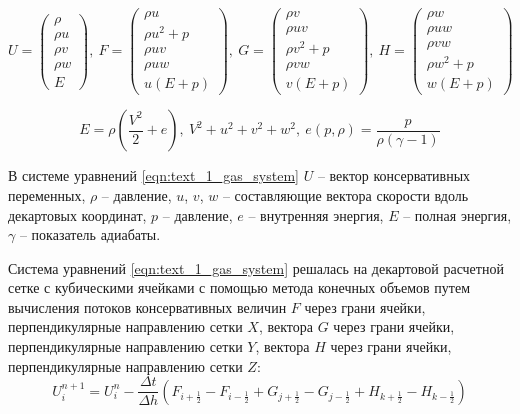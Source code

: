 \begin{equation}
U = \begin{pmatrix}
	\rho \\
	\rho u \\
	\rho v \\
	\rho w \\
	E
\end{pmatrix}, \
F = \begin{pmatrix}
	\rho u \\
	\rho u^2 + p \\
	\rho u v \\
	\rho u w \\
	u (E + p)
\end{pmatrix}, \
G = \begin{pmatrix}
	\rho v \\
	\rho u v \\
	\rho v^2 + p \\
	\rho v w \\
	v (E + p)
\end{pmatrix}, \
H = \begin{pmatrix}
	\rho w \\
	\rho u w \\
	\rho v w \\
	\rho w^2 + p \\
	w (E + p)
\end{pmatrix}
\end{equation}

\begin{equation}
	E = \rho \left( \frac{V^2}{2} + e \right), \ V^2 + u^2 + v^2 + w^2, \ e(p, \rho) = \frac{p}{\rho (\gamma - 1)}
\end{equation}

В системе уравнений \eqref{eqn:text_1_gas_system} $U$ -- вектор консервативных переменных, $\rho$ -- давление, $u$, $v$, $w$ -- составляющие вектора скорости вдоль декартовых координат, $p$ -- давление, $e$ -- внутренняя энергия, $E$ -- полная энергия, $\gamma$ -- показатель адиабаты.

Система уравнений \eqref{eqn:text_1_gas_system} решалась на декартовой расчетной сетке с кубическими ячейками с помощью метода конечных объемов путем вычисления потоков консервативных величин $F$ через грани ячейки, перпендикулярные направлению сетки $X$, вектора $G$ через грани ячейки, перпендикулярные направлению сетки $Y$, вектора $H$ через грани ячейки, перпендикулярные направлению сетки $Z$:
\begin{equation}
	U_i^{n + 1} = U_i^n - \frac{\Delta t}{\Delta h} \left( F_{i + \frac{1}{2}} - F_{i - \frac{1}{2}} + G_{j + \frac{1}{2}} - G_{j - \frac{1}{2}} + H_{k + \frac{1}{2}} - H_{k - \frac{1}{2}} \right)
\end{equation}

